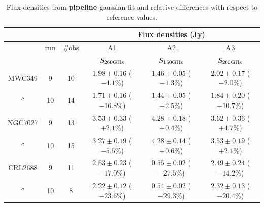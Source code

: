 \begin{table}[bh]
\begin{center}
\begin{tabular}{|c|c|c|c|c|c|}
\hline
\multicolumn{3}{|c}{}  & \multicolumn{3}{|c|}{Flux  densities (Jy)}   \\
\hline\hline
         & run  & \#obs &  A1                        &  A2                        &           A3                  \\
         &      &       &  $S_{260 {\rm GHz}}$       &  $S_{150 {\rm GHz}}$       & $S_{260 {\rm GHz}}$         \\
\hline  
MWC349   &  9   & 10    &  $1.98\pm0.16$ ($-4.1\%$)  &  $1.46\pm0.05$ ($-1.3\%$)  &  $2.02\pm0.17$ ($-2.0\%$)     \\
  $''$   & 10   & 14    &  $1.71\pm0.16$ ($-16.8\%$) & $1.44\pm0.05$ ($-2.5\%$)   &  $1.84\pm0.20$ ($-10.7\%$)      \\ 
  \hline
NGC7027  &  9   & 13    &  $3.53\pm0.33$ ($+2.1\%$)  &  $4.28\pm0.18$ ($+0.4\%$)  & $3.62\pm0.36$ ($+4.7\%$)      \\
  $''$   & 10   & 15    &  $3.27\pm0.19$ ($-5.5\%$)  & $4.28\pm0.14$ ($+0.6\%$)   &  $3.53\pm0.19$ ($+2.1\%$)        \\ 
  \hline
CRL2688  &  9   & 11    &  $2.53\pm0.23$ ($-17.0\%$) &  $0.55\pm0.02$ ($-27.5\%$) &  $2.49\pm0.24$ ($-14.2\%$)    \\
  $''$   & 10   &  8    &  $2.22\pm0.12$ ($-23.6\%$) &  $0.54\pm0.02$ ($-29.3\%$) &  $2.32\pm0.13$ ($-20.4\%$)     \\
\hline
\end{tabular}
\caption{Flux densities  from {\bf pipeline} gaussian fit and relative differences  with respect to reference values.}
\label{tab:flux_sec_NK}
\end{center}
\end{table}

\\

\\

